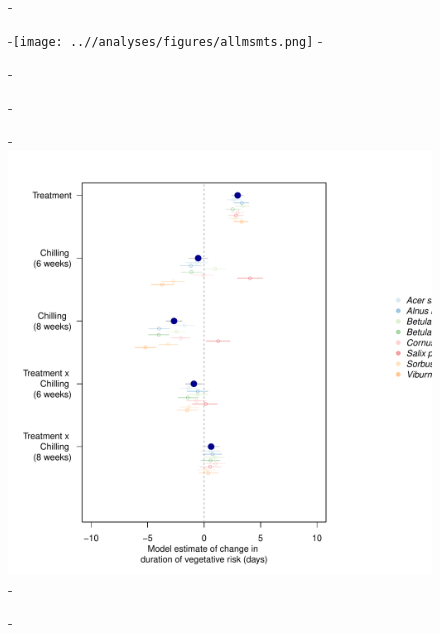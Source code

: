 \documentclass{article}\usepackage[]{graphicx}\usepackage[]{color}
\begin{document}
  
  {\begin{figure} [H]
  -\begin{center}
  -\texttt{[image: ..//analyses/figures/allmsmts.png]} %
  -\end{center}
  -\end{figure}}
  
  {\begin{figure} [H]
  -\begin{center}
  -\includegraphics[width=16cm]{..//analyses/figures/dvr_brms.pdf} %
  -\end{center}
  -\end{figure}}
  
\end{document}
